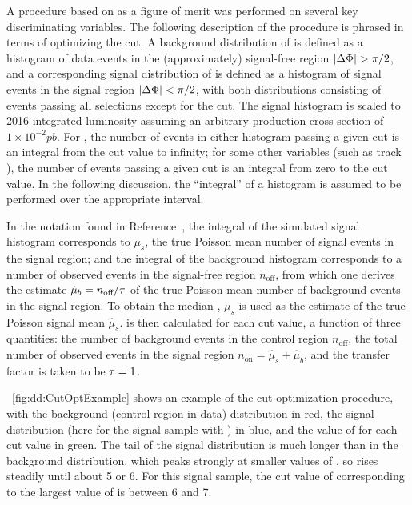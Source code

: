 A procedure based on \ZBi as a figure of merit was performed on several key discriminating variables.
The following description of the procedure is phrased in terms of optimizing the \LxySig cut.
A background distribution of \LxySig is defined as a histogram of data events in the (approximately) signal-free region $|\Delta\Phi| > \pi/2$, and a corresponding signal distribution of \LxySig is defined as a histogram of signal events in the signal region \mbox{$|\Delta\Phi| < \pi/2$}, with both distributions consisting of events passing all selections except for the \LxySig cut.
The signal histogram is scaled to 2016 integrated luminosity assuming an arbitrary production cross section of $1\times 10^{-2}\unit{pb}$.
For \LxySig, the number of events in either histogram passing a given cut is an integral from the cut value to infinity; for some other variables (such as track \normchisq), the number of events passing a given cut is an integral from zero to the cut value.
In the following discussion, the ``integral'' of a histogram is assumed to be performed over the appropriate interval.

In the notation found in Reference~\cite{Cousins:ZBi2008}, the integral of the simulated signal histogram corresponds to ${\mu}_s$, the true Poisson mean number of signal events in the signal region;
and the integral of the background histogram corresponds to a number of observed events in the signal-free region $n_\text{off}$, from which one derives the estimate $\hat{\mu}_b = n_\text{off}/\tau$ of the true Poisson mean number of background events in the signal region.
To obtain the median \ZBi, $\mu_s$ is used as the estimate of the true Poisson signal mean $\hat{\mu}_s$.
\ZBi is then calculated for each cut value, a function of three quantities: the number of background events in the control region $n_\text{off}$, the total number of observed events in the signal region $n_\text{on} = \hat{\mu}_s + \hat{\mu}_b$, and the transfer factor is taken to be $\tau = 1$.

\Fig~\ref{fig:dd:CutOptExample} shows an example of the cut optimization procedure, with the background (control region in data) distribution in red, the signal distribution (here for the \twoMu signal sample with ) in blue, and the value of \ZBi for each cut value in green.
The tail of the signal distribution is much longer than in the background distribution, which peaks strongly at smaller values of \LxySig, so \ZBi rises steadily until about 5 or 6.
For this signal sample, the cut value of \LxySig corresponding to the largest value of \ZBi is between 6 and 7.

